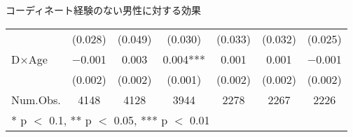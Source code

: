 \documentclass[
      aspectratio=169,
        12pt,
    ]{beamer}
\begin{document}
\begin{frame}{コーディネート経験のない男性に対する効果}
\begin{table}
\begin{tabular}[t]{lcccccc}
 & (\num{0.028}) & (\num{0.049}) & (\num{0.030}) & (\num{0.033}) & (\num{0.032}) & (\num{0.025})\\
D×Age & \num{-0.001} & \num{0.003} & \num{0.004}*** & \num{0.001} & \num{0.001} & \num{-0.001}\\
 & (\num{0.002}) & (\num{0.002}) & (\num{0.001}) & (\num{0.002}) & (\num{0.002}) & (\num{0.002})\\
\midrule
Num.Obs. & \num{4148} & \num{4128} & \num{3944} & \num{2278} & \num{2267} & \num{2226}\\
\bottomrule
\multicolumn{7}{l}{\rule{0pt}{1em}* p $<$ 0.1, ** p $<$ 0.05, *** p $<$ 0.01}\\
\end{tabular}
\end{table}
\end{frame}
\end{document}
